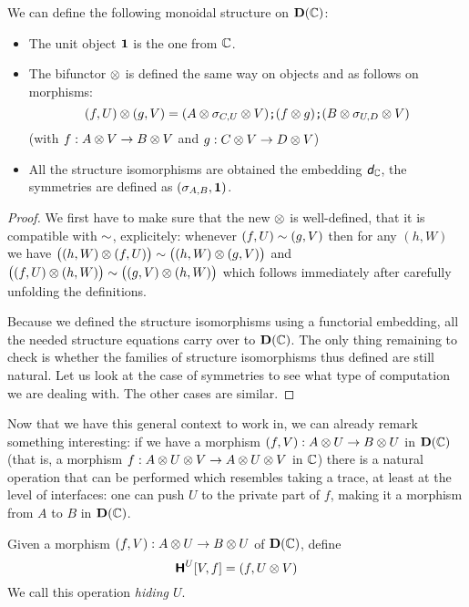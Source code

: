 \begin{proposition}
	We can define the following monoidal structure on $\mathbf D(\mathbb{C})$:
	\begin{itemize}
		\item The unit object $\mathbf 1$ is the one from $\mathbb{C}$.
		\item The bifunctor $\otimes$ is defined the same way on objects and as follows on morphisms:
		$$(f,U)\otimes(g,V)=(A\otimes \sigma_{C,U}\otimes V)\textbf{\tt;}(f\otimes g)\textbf{\tt;}(B\otimes \sigma_{U,D}\otimes V)
		$$
		(with $f:A\otimes V\rightarrow B\otimes V$ and $g:C\otimes V\rightarrow D\otimes V$)
		\item All the structure isomorphisms are obtained \via the embedding $\textit{\textsf{d}}_{\mathbb{C}}$, \eg the
		symmetries are defined as $(\sigma_{A,B}, \mathbf 1)$.
	\end{itemize}
\end{proposition}

\begin{proof}
	We first have to make sure that the new $\otimes$ is well-defined, \ie that it is compatible with
	$\sim$, explicitely: whenever $(f,U)\sim(g,V)$ then for any $(h,W)$ we have 
	$\big((h,W)\otimes(f,U)\big)\sim\big((h,W)\otimes(g,V)\big)$ and 
	$\big((f,U)\otimes(h,W)\big)\sim\big((g,V)\otimes(h,W)\big)$ which follows immediately after carefully
	unfolding the definitions.

	Because we defined the structure isomorphisms using a functorial embedding, all the needed
	structure equations carry over to $\mathbf D(\mathbb{C})$. The only thing remaining to check is whether
	the families of structure isomorphisms thus defined are still natural.
	Let us look at the case of symmetries to see what type of computation we are dealing with. The
	other cases are similar.
	
\end{proof}

Now that we have this general context to work in, we can already remark something interesting:
if we have a morphism $(f,V):A\otimes U\rightarrow B\otimes U$ in $\mathbf D(\mathbb{C})$ (that is, a morphism
$f:A\otimes U\otimes V\rightarrow A\otimes U\otimes V$ in $\mathbb{C}$) there is a natural operation that can be
performed which resembles taking a trace, at least at the level of interfaces: one can push $U$
to the private part of $f$, making it a morphism from $A$ to $B$ in $\mathbf D(\mathbb{C})$.

\begin{definition}[Hiding]
	Given a morphism $(f,V):A\otimes U\rightarrow B\otimes U$ of $\mathbf D(\mathbb{C})$, define 
	$${\normalfont\textsf{\textbf{H}}^{U}}[V,f]=(f,U\otimes V)$$
	We call this operation \emph{hiding $U$}.
\end{definition}

